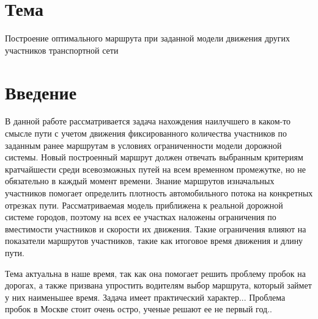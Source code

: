 \documentclass[12pt, a4paper]{article}
\begin{document}
 \section*{Тема}
Построение оптимального маршрута при заданной модели движения других участников транспортной сети


\section*{Введение}

В данной работе рассматривается задача нахождения наилучшего в каком-то смысле пути с учетом движения фиксированного количества участников по заданным ранее маршрутам в условиях ограниченности модели дорожной системы. Новый построенный маршрут должен отвечать выбранным критериям кратчайшести среди всевозможных путей на всем временном промежутке, но не обязательно в каждый момент времени. Знание маршрутов изначальных участников помогает определить плотность автомобильного потока на конкретных отрезках пути. Рассматриваемая модель приближена к реальной дорожной системе городов, поэтому на всех ее участках наложены ограничения по вместимости участников и скорости их движения. Такие ограничения влияют на показатели маршрутов участников, такие как итоговое время движения и длину пути. 


Тема актуальна в наше время, так как она помогает решить проблему пробок на дорогах, а также призвана упростить водителям выбор маршрута, который займет у них наименьшее время. Задача имеет практический характер... Проблема пробок в Москве стоит очень остро, ученые решают ее не первый год..
\end{document}
